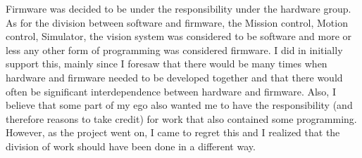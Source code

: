 Firmware was decided to be under the responsibility under the hardware group. As for the division between software and firmware, the Mission control, Motion control, Simulator, the vision system was considered to be software and more or less any other form of programming was considered firmware. \newline
I did in initially support this, mainly since I foresaw that there would be many times when hardware and firmware needed to be developed together and that there would often be significant interdependence between hardware and firmware. Also, I believe that some part of my ego also wanted me to have the responsibility (and therefore reasons to take credit) for work that also contained some programming. \newline
However, as the project went on, I came to regret this and I realized that the division of work should have been done in a different way.

\newpage